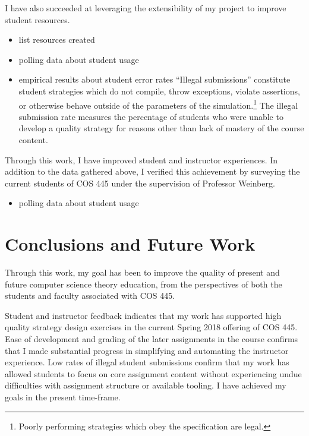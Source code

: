 \documentclass[pageno]{jpaper}
\begin{document}
I have also succeeded at leveraging the extensibility of my project to improve student resources.

\begin{itemize}
\item list resources created
\item polling data about student usage
\item empirical results about student error rates
  ``Illegal submissions'' constitute student strategies which do not compile, throw exceptions, violate assertions, or otherwise behave outside of the parameters of the simulation.\footnote{Poorly performing strategies which obey the specification are legal.}
  The illegal submission rate measures the percentage of students who were unable to develop a quality strategy for reasons other than lack of mastery of the course content.
\end{itemize}

Through this work, I have improved student and instructor experiences.
In addition to the data gathered above, I verified this achievement by surveying the current students of COS 445 under the supervision of Professor Weinberg.
\begin{itemize}
\item polling data about student usage
\end{itemize}



\section*{Conclusions and Future Work}
Through this work, my goal has been to improve the quality of present and future computer science theory education, from the perspectives of both the students and faculty associated with COS 445.

Student and instructor feedback indicates that my work has supported high quality strategy design exercises in the current Spring 2018 offering of COS 445.
Ease of development and grading of the later assignments in the course confirms that I made substantial progress in simplifying and automating the instructor experience.
Low rates of illegal student submissions confirm that my work has allowed students to focus on core assignment content without experiencing undue difficulties with assignment structure or available tooling.
I have achieved my goals in the present time-frame.
\end{document}
